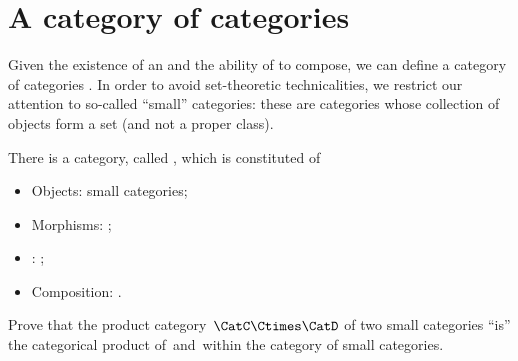 \section{A category of categories}

Given the existence of an  and the ability of  to compose, we can define a category of categories \Category.
In order to avoid set-theoretic technicalities, we restrict our attention to so-called ``small'' categories: these are categories whose collection of objects form a set (and not a proper class).

\begin{ctdefinition}
    \label{def:Category}
    There is a category, called \Category, which is constituted of
    \begin{itemize}
        \item Objects: small categories;
        \item Morphisms: ;
        \item {}: ;
        \item Composition: .
    \end{itemize}
\end{ctdefinition}
\vfill
\begin{gradedexercise}
    Prove that the product category~$\CatC \Ctimes \CatD$ of two small categories ``is'' the categorical product of~\CatC and~\CatD within the category of small categories.
\end{gradedexercise}
